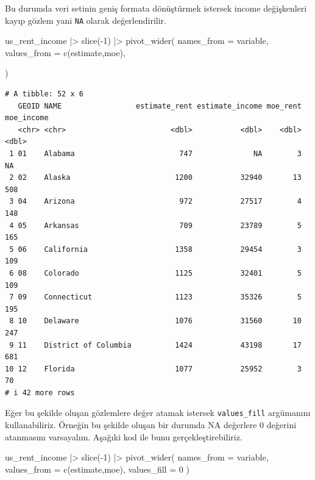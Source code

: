 \documentclass[
  letterpaper,
  DIV=11,
  numbers=noendperiod]{scrreprt}
\newenvironment{Shaded}{\begin{snugshade}}{\end{snugshade}}
\newcommand{\AttributeTok}[1]{\textcolor[rgb]{0.40,0.45,0.13}{#1}}
\newcommand{\DecValTok}[1]{\textcolor[rgb]{0.68,0.00,0.00}{#1}}
\newcommand{\FunctionTok}[1]{\textcolor[rgb]{0.28,0.35,0.67}{#1}}
\newcommand{\NormalTok}[1]{\textcolor[rgb]{0.00,0.23,0.31}{#1}}
\newcommand{\SpecialCharTok}[1]{\textcolor[rgb]{0.37,0.37,0.37}{#1}}
\begin{document}
Bu durumda veri setinin geniş formata dönüştürmek istersek income
değişkenleri kayıp gözlem yani \texttt{NA} olarak değerlendirilir.

\begin{Shaded}
\begin{Highlighting}[]
\NormalTok{us\_rent\_income }\SpecialCharTok{|\textgreater{}} 
  \FunctionTok{slice}\NormalTok{(}\SpecialCharTok{{-}}\DecValTok{1}\NormalTok{) }\SpecialCharTok{|\textgreater{}} 
  \FunctionTok{pivot\_wider}\NormalTok{(}
    \AttributeTok{names\_from =}\NormalTok{ variable,}
    \AttributeTok{values\_from =} \FunctionTok{c}\NormalTok{(estimate,moe),}
    
\NormalTok{  )}
\end{Highlighting}
\end{Shaded}

\begin{verbatim}
# A tibble: 52 x 6
   GEOID NAME                 estimate_rent estimate_income moe_rent moe_income
   <chr> <chr>                        <dbl>           <dbl>    <dbl>      <dbl>
 1 01    Alabama                        747              NA        3         NA
 2 02    Alaska                        1200           32940       13        508
 3 04    Arizona                        972           27517        4        148
 4 05    Arkansas                       709           23789        5        165
 5 06    California                    1358           29454        3        109
 6 08    Colorado                      1125           32401        5        109
 7 09    Connecticut                   1123           35326        5        195
 8 10    Delaware                      1076           31560       10        247
 9 11    District of Columbia          1424           43198       17        681
10 12    Florida                       1077           25952        3         70
# i 42 more rows
\end{verbatim}

Eğer bu şekilde oluşan gözlemlere değer atamak istersek
\texttt{values\_fill} argümanını kullanabiliriz. Örneğin bu şekilde
oluşan bir durumda NA değerlere 0 değerini atanmasını varsayalım.
Aşağıki kod ile bunu gerçekleştirebiliriz.

\begin{Shaded}
\begin{Highlighting}[]
\NormalTok{us\_rent\_income }\SpecialCharTok{|\textgreater{}} 
  \FunctionTok{slice}\NormalTok{(}\SpecialCharTok{{-}}\DecValTok{1}\NormalTok{) }\SpecialCharTok{|\textgreater{}} 
  \FunctionTok{pivot\_wider}\NormalTok{(}
    \AttributeTok{names\_from =}\NormalTok{ variable,}
    \AttributeTok{values\_from =} \FunctionTok{c}\NormalTok{(estimate,moe),}
    \AttributeTok{values\_fill =} \DecValTok{0}
\NormalTok{  )}
\end{Highlighting}
\end{Shaded}
\end{document}
